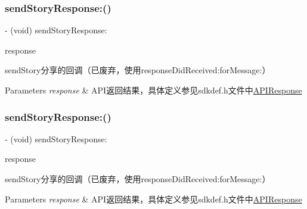 \subsubsection{\texorpdfstring{send\+Story\+Response\+:()}{sendStoryResponse:()}\hspace{0.1cm}{\footnotesize\ttfamily [1/2]}}
{\footnotesize\ttfamily -\/ (void) send\+Story\+Response\+: \begin{DoxyParamCaption}\item[{(\mbox{\hyperlink{interface_a_p_i_response}{A\+P\+I\+Response}} $\ast$)}]{response }\end{DoxyParamCaption}\hspace{0.3cm}{\ttfamily [optional]}}

send\+Story分享的回调（已废弃，使用response\+Did\+Received\+:for\+Message\+:） 
\begin{DoxyParams}{Parameters}
{\em response} & A\+P\+I返回结果，具体定义参见sdkdef.\+h文件中\mbox{\hyperlink{interface_a_p_i_response}{A\+P\+I\+Response}} \\
\hline
\end{DoxyParams}
\mbox{\label{protocol_tencent_session_delegate-p_ac6628547be6fc0208797fbd6a5d7830c}} 
\subsubsection{\texorpdfstring{send\+Story\+Response\+:()}{sendStoryResponse:()}\hspace{0.1cm}{\footnotesize\ttfamily [2/2]}}
{\footnotesize\ttfamily -\/ (void) send\+Story\+Response\+: \begin{DoxyParamCaption}\item[{(\mbox{\hyperlink{interface_a_p_i_response}{A\+P\+I\+Response}} $\ast$)}]{response }\end{DoxyParamCaption}\hspace{0.3cm}{\ttfamily [optional]}}

send\+Story分享的回调（已废弃，使用response\+Did\+Received\+:for\+Message\+:） 
\begin{DoxyParams}{Parameters}
{\em response} & A\+P\+I返回结果，具体定义参见sdkdef.\+h文件中\mbox{\hyperlink{interface_a_p_i_response}{A\+P\+I\+Response}} \\
\hline
\end{DoxyParams}
\mbox{\label{protocol_tencent_session_delegate-p_ae487da5d4b7d86179c8f98cbceac848d}} 
